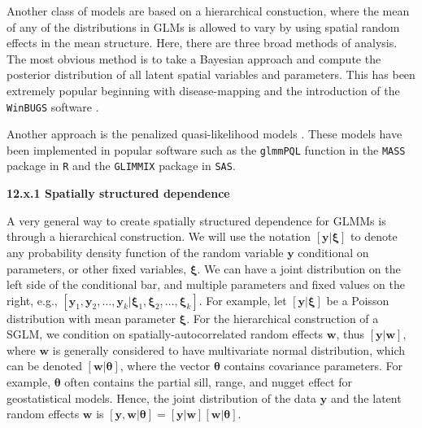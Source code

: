 \documentclass[12pt, titlepage]{article}
\begin{document}
Another class of models are based on a hierarchical constuction, where the mean of any of the distributions in GLMs is allowed to vary by using spatial random effects in the mean structure.  Here, there are three broad methods of analysis.  The most obvious method is to take a Bayesian approach and compute the posterior distribution of all latent spatial variables and parameters.  This has been extremely popular beginning with disease-mapping \citep{clayton_empirical_1987} and the introduction of the \texttt{WinBUGS} software \citep{lunn_winbugs-bayesian_2000}. 

Another approach is the penalized quasi-likelihood models \citep{breslow_approximate_1993, WolfingerEtAl1993GeneralizedLinearMixed233}.  These models have been implemented in popular software such as the \texttt{glmmPQL} function in the \texttt{MASS} package in \texttt{R} and the \texttt{GLIMMIX} package in \texttt{SAS}.




{\large \flushleft \textbf{12.x.1 Spatially structured dependence}}

A very general way to create spatially structured dependence for GLMMs is through a hierarchical construction.  We will use the notation $[\mathbf{y}|\boldsymbol{\xi}]$ to denote any probability density function of the random variable $\mathbf{y}$ conditional on parameters, or other fixed variables, $\boldsymbol{\xi}$. We can have a joint distribution on the left side of the conditional bar, and multiple parameters and fixed values on the right, e.g., $[\mathbf{y}_{1},\mathbf{y}_{2}, \ldots, \mathbf{y}_{k} | \boldsymbol{\xi}_{1}, \boldsymbol{\xi}_{2}, \ldots, \boldsymbol{\xi}_{k}]$. For example, let $[\mathbf{y}|\boldsymbol{\xi}]$ be a Poisson distribution with mean parameter $\boldsymbol{\xi}$.  For the hierarchical construction of a SGLM, we condition on spatially-autocorrelated random effects $\mathbf{w}$, thus $[\mathbf{y}|\mathbf{w}]$, where $\mathbf{w}$ is generally considered to have multivariate normal distribution, which can be denoted $[\mathbf{w}|\boldsymbol{\theta}]$, where the vector $\boldsymbol{\theta}$ contains covariance parameters.  For example, $\boldsymbol{\theta}$ often contains the partial sill, range, and nugget effect for geostatistical models.  Hence, the joint distribution of the data $\mathbf{y}$ and the latent random effects $\mathbf{w}$ is $[\mathbf{y},\mathbf{w}|\boldsymbol{\theta}] = [\mathbf{y}|\mathbf{w}][\mathbf{w}|\boldsymbol{\theta}]$.  
\end{document}
